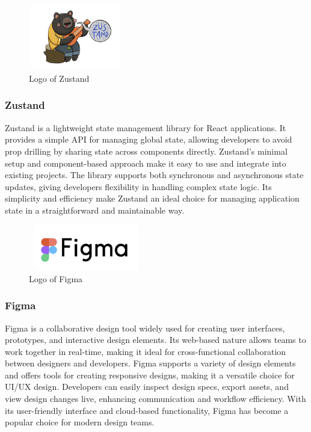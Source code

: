 \documentclass[conference]{IEEEtran}
\begin{document}
        \begin{figure}[htbp]
            \centerline{\includegraphics[width=4cm, height=3cm]{Images/logo/zustand.png}}
            \caption{Logo of Zustand}
            \label{fig}
        \end{figure}
        \subsubsection{Zustand}
            Zustand is a lightweight state management library for React applications. It provides a simple API for managing global state, allowing developers to avoid prop drilling by sharing state across components directly. Zustand's minimal setup and component-based approach make it easy to use and integrate into existing projects. The library supports both synchronous and asynchronous state updates, giving developers flexibility in handling complex state logic. Its simplicity and efficiency make Zustand an ideal choice for managing application state in a straightforward and maintainable way.

        \begin{figure}[htbp]
            \centerline{\includegraphics[width=5cm, height=2cm]{Images/logo/figma.png}}
            \caption{Logo of Figma}
            \label{fig}
        \end{figure}
        \subsubsection{Figma}
            Figma is a collaborative design tool widely used for creating user interfaces, prototypes, and interactive design elements. Its web-based nature allows teams to work together in real-time, making it ideal for cross-functional collaboration between designers and developers. Figma supports a variety of design elements and offers tools for creating responsive designs, making it a versatile choice for UI/UX design. Developers can easily inspect design specs, export assets, and view design changes live, enhancing communication and workflow efficiency. With its user-friendly interface and cloud-based functionality, Figma has become a popular choice for modern design teams.
\end{document}

